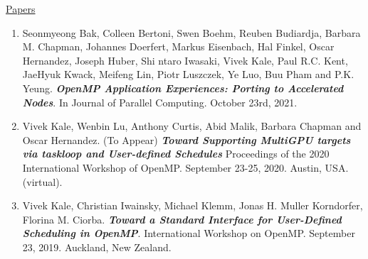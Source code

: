 




\underline{Papers}
\vspace*{-0.05in}
\begin{enumerate} 
\item Seonmyeong Bak, Colleen Bertoni, Swen Boehm, Reuben Budiardja, Barbara M. Chapman, Johannes Doerfert, Markus Eisenbach, Hal Finkel, Oscar Hernandez, Joseph Huber, Shi
ntaro Iwasaki, Vivek Kale, Paul R.C. Kent, JaeHyuk Kwack, Meifeng Lin, Piotr Luszczek, Ye Luo, Buu Pham and P.K. Yeung. \textbf{\textit{OpenMP Application Experiences: Porting to Accelerated Nodes}}. In Journal of Parallel Computing. October 23rd, 2021.

\item Vivek Kale, Wenbin Lu, Anthony Curtis, Abid Malik, Barbara Chapman and Oscar Hernandez. (To Appear) \textbf{\textit{Toward Supporting MultiGPU targets via taskloop and User-defined Schedules}} Proceedings of the 2020 International Workshop of OpenMP. September 23-25, 2020. Austin, USA. (virtual). 
\item Vivek Kale, Christian Iwainsky, Michael Klemm, Jonas H. Muller Korndorfer, Florina M. Ciorba. \textbf{\textit{Toward a Standard Interface for User-Defined Scheduling in OpenMP}}. International Workshop on OpenMP. September 23, 2019. Auckland, New Zealand.


\end{enumerate}
